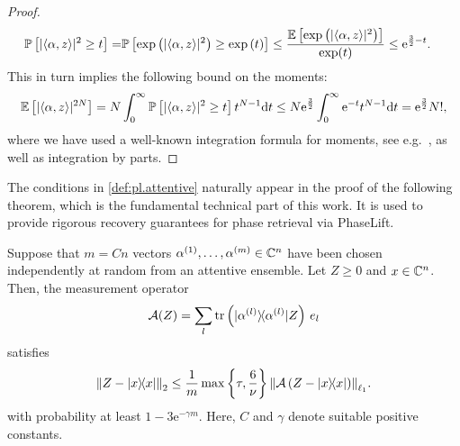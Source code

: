 \begin{proof}
  \begin{align}
    \mathbb{P} \left[ | \langle \alpha, z \rangle|^2 \geq t \right]
    =& \mathbb{P} \left[ \exp \left( | \langle  \alpha, z \rangle|^2 \right) \geq \exp \left( t \right) \right]
    \leq \frac{ \mathbb{E} \left[ \exp \left( | \langle \alpha,  z \rangle|^2 \right) \right]}{\exp (t)} \leq \mathrm{e}^{\frac{3}{2}-t}.
  \end{align}
  This in turn implies the following bound on the moments:
  \begin{align}
    \mathbb{E} \left[ | \langle  \alpha, z \rangle|^{2N} \right]
    =  N \int_0^\infty \mathbb{P}\left[ | \langle  \alpha, z \rangle|^2\geq t \right] t^{N-1} \mathrm{d}t \leq N \mathrm{e}^{\frac{3}{2}} \int_0^\infty \mathrm{e}^{-t} t^{N-1} \mathrm{d}t
    = \mathrm{e}^{\frac{3}{2}} N!,
  \end{align}
  where we have used a well-known integration formula for moments, see e.g.\ \cite[Prop.~7.1]{Foucart_2013_Mathematical}, as well as integration by parts.
\end{proof}

The conditions in \cref{def:pl.attentive} naturally appear in the proof of the following theorem, which is the fundamental technical part of this work.
It is used to provide rigorous recovery guarantees for phase retrieval via PhaseLift.

\begin{proposition}%
  \label{prop:pl.nsp}
  Suppose that $m = Cn$ vectors $\alpha^{(1)},\ldots,\alpha^{(m)} \in \mathbb{C}^n$ have been chosen independently at random from an attentive ensemble.
  Let $Z\geq 0$ and $x \in {\mathbb{C}}^n$.
  Then, the measurement operator
  \[
    \label{eq:pl.measurement_operator_rank1}
    \mathcal{A}(Z) = \sum_l \tr \left(\ketbra{\alpha\ind{l}}  Z\right) \, {e_l}
  \]
  satisfies
  \[
    \label{eq:pl.rec_guarantee_nsp}
    \Fnorm{Z - \ketbra{x}}
    \leq \frac{1}{m} \max \left\{ \tau, \frac{6}{\nu} \right\}  \Norm{\mathcal{A}\left( Z - \ketbra{x} \right)}_{\ell_1}.
  \]
  with probability at least $1- 3\mathrm{e}^{-\gamma m}$.
  Here, $C$ and $\gamma$ denote suitable positive constants.
\end{proposition}

